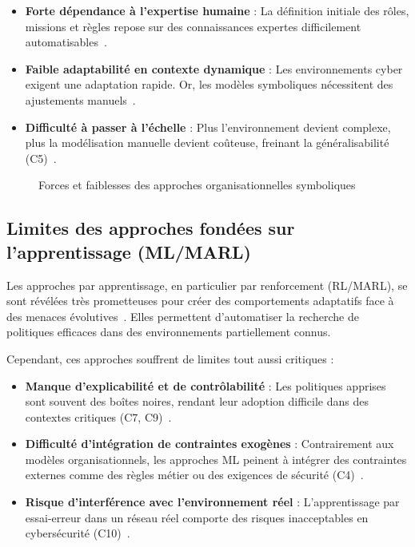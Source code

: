 \documentclass[ twoside,openright,titlepage,numbers=noenddot,headinclude,%
                footinclude=true,cleardoublepage=empty,abstractoff, %
                BCOR=5mm,paper=a4,fontsize=11pt,%
                french,american,%
                ]{scrreprt}
\begin{document}
\begin{itemize}
    \item \textbf{Forte dépendance à l'expertise humaine} : La définition initiale des rôles, missions et règles repose sur des connaissances expertes difficilement automatisables~\cite{Boella2008}.
    \item \textbf{Faible adaptabilité en contexte dynamique} : Les environnements cyber exigent une adaptation rapide. Or, les modèles symboliques nécessitent des ajustements manuels~\cite{Chehbi2020}.
    \item \textbf{Difficulté à passer à l'échelle} : Plus l'environnement devient complexe, plus la modélisation manuelle devient coûteuse, freinant la généralisabilité (C5)~\cite{Picard2003}.
\end{itemize}

\begin{figure}[H]
    \centering
    \caption{Forces et faiblesses des approches organisationnelles symboliques}
    \label{fig:limits_symbolic}
\end{figure}

\subsection{Limites des approches fondées sur l'apprentissage (ML/MARL)}

Les approches par apprentissage, en particulier par renforcement (RL/MARL), se sont révélées très prometteuses pour créer des comportements adaptatifs face à des menaces évolutives~\cite{Zhang2021survey, Kim2020rlcyberdefense}. Elles permettent d'automatiser la recherche de politiques efficaces dans des environnements partiellement connus.

Cependant, ces approches souffrent de limites tout aussi critiques :

\begin{itemize}
    \item \textbf{Manque d'explicabilité et de contrôlabilité} : Les politiques apprises sont souvent des boîtes noires, rendant leur adoption difficile dans des contextes critiques (C7, C9)~\cite{Gunning2019XAI, Albrecht2018autonomous}.
    \item \textbf{Difficulté d'intégration de contraintes exogènes} : Contrairement aux modèles organisationnels, les approches ML peinent à intégrer des contraintes externes comme des règles métier ou des exigences de sécurité (C4)~\cite{Chouldechova2018}.
    \item \textbf{Risque d'interférence avec l'environnement réel} : L'apprentissage par essai-erreur dans un réseau réel comporte des risques inacceptables en cybersécurité (C10)~\cite{Miehling2015}.
\end{itemize}
\end{document}
